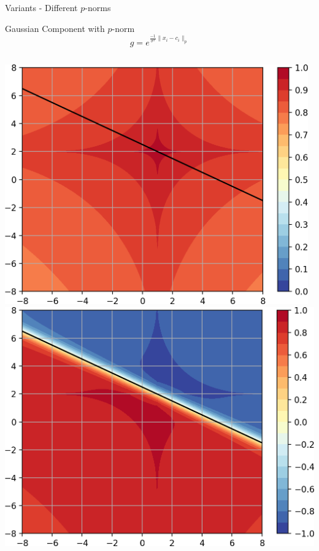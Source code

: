 \documentclass{beamer}
\begin{document}
\begin{frame}{Variants - Different $p$-norms}
    \vspace{-0.3cm}
    \begin{block}{Gaussian Component with $p$-norm}
        $$ g = e^{\frac{-1}{\sigma^2}\lVert x_i-c_i \lVert_p }$$
    \end{block}
    \vspace{0.1cm}
    \centering
    \begin{minipage}{0.87\textwidth}
    \begin{columns}
    \begin{column}{.33\textwidth}
        \raggedright
        \includegraphics[width=0.98\textwidth]{images/Variants-Norms/ord0.5_g-cropped.png}\\
        \includegraphics[width=\textwidth]{images/Variants-Norms/ord0.5-cropped.png}\\

\end{column}
\end{columns}
\end{minipage}
\end{frame}
\end{document}
